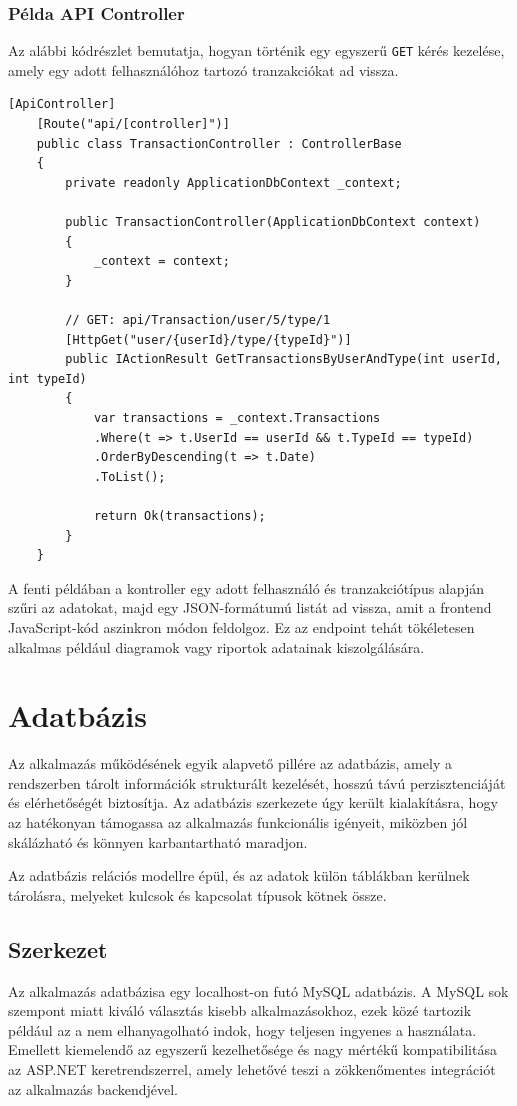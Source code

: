 \subsubsection{Példa API Controller}

Az alábbi kódrészlet bemutatja, hogyan történik egy egyszerű \texttt{GET} kérés kezelése, amely egy adott felhasználóhoz tartozó tranzakciókat ad vissza.

\begin{lstlisting}[language={[Sharp]C}]
	[ApiController]
	[Route("api/[controller]")]
	public class TransactionController : ControllerBase
	{
		private readonly ApplicationDbContext _context;
		
		public TransactionController(ApplicationDbContext context)
		{
			_context = context;
		}
		
		// GET: api/Transaction/user/5/type/1
		[HttpGet("user/{userId}/type/{typeId}")]
		public IActionResult GetTransactionsByUserAndType(int userId, int typeId)
		{
			var transactions = _context.Transactions
			.Where(t => t.UserId == userId && t.TypeId == typeId)
			.OrderByDescending(t => t.Date)
			.ToList();
			
			return Ok(transactions);
		}
	}
\end{lstlisting}

A fenti példában a kontroller egy adott felhasználó és tranzakciótípus alapján szűri az adatokat, majd egy JSON-formátumú listát ad vissza, amit a frontend JavaScript-kód aszinkron módon feldolgoz. Ez az endpoint tehát tökéletesen alkalmas például diagramok vagy riportok adatainak kiszolgálására.

\section{Adatbázis}
Az alkalmazás működésének egyik alapvető pillére az adatbázis, amely a rendszerben tárolt információk strukturált kezelését, hosszú távú perzisztenciáját és elérhetőségét biztosítja. Az adatbázis szerkezete úgy került kialakításra, hogy az hatékonyan támogassa az alkalmazás funkcionális igényeit, miközben jól skálázható és könnyen karbantartható maradjon.

Az adatbázis relációs modellre épül, és az adatok külön táblákban kerülnek tárolásra, melyeket kulcsok és kapcsolat típusok kötnek össze.

\subsection{Szerkezet}
Az alkalmazás adatbázisa egy localhost-on futó MySQL adatbázis.
A MySQL sok szempont miatt kiváló választás kisebb alkalmazásokhoz, ezek közé tartozik például az a nem elhanyagolható
indok, hogy teljesen ingyenes a használata. Emellett kiemelendő az egyszerű kezelhetősége és nagy mértékű kompatibilitása az ASP.NET keretrendszerrel, amely lehetővé teszi a zökkenőmentes integrációt az alkalmazás backendjével. 

